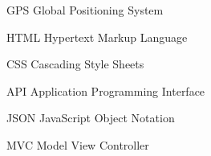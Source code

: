 \begin{siglas}
  \item[GPS] Global Positioning System
  \item[HTML] Hypertext Markup Language
  \item[CSS] Cascading Style Sheets
  \item[API] Application Programming Interface
  \item[JSON] JavaScript Object Notation
  \item[MVC] Model View Controller
\end{siglas}
